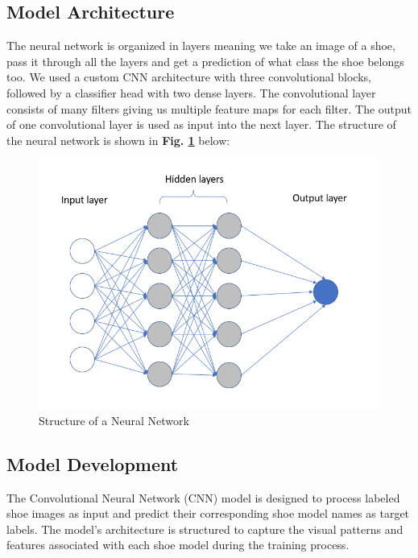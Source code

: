 \documentclass[11pt,a4paper]{article}
\begin{document}
\subsection{Model Architecture}
The neural network is organized in layers meaning we take an image of a shoe, pass it through all the layers and get a prediction of what class the shoe belongs too. We used a custom CNN architecture with three convolutional blocks, followed by a classifier head with two dense layers. The convolutional layer consists of many filters giving us multiple feature maps for each filter.  The output of one convolutional layer is used as input into the next layer. The structure of the neural network is shown in \textbf{Fig. \ref{neural_network}} below:

 \begin{figure}[h!]
\centering
  \includegraphics[width=0.75\linewidth]{neural network.png}
  \caption{Structure of a Neural Network}
  \label{neural_network}
\end{figure}

\subsection{Model Development}
The Convolutional Neural Network (CNN) model is designed to process labeled shoe images as input and predict their corresponding shoe model names as target labels. The model's architecture is structured to capture the visual patterns and features associated with each shoe model during the training process.
\end{document}
